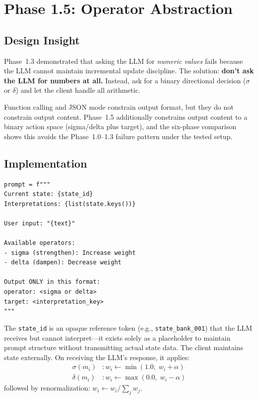 \documentclass[11pt,a4paper]{article}
\begin{document}
\section{Phase 1.5: Operator Abstraction}
\label{sec:phase1_5}

\subsection{Design Insight}

Phase~1.3 demonstrated that asking the LLM for \textit{numeric values} fails because
the LLM cannot maintain incremental update discipline. The solution: \textbf{don't
ask the LLM for numbers at all.} Instead, ask for a binary directional decision
($\sigma$ or $\delta$) and let the client handle all arithmetic.

Function calling and JSON mode constrain output format, but they do not constrain
output content. Phase~1.5 additionally constrains output content to a binary
action space (sigma/delta plus target), and the six-phase comparison
shows this avoids the Phase~1.0--1.3 failure pattern under the tested setup.

\subsection{Implementation}

\begin{lstlisting}
prompt = f"""
Current state: {state_id}
Interpretations: {list(state.keys())}

User input: "{text}"

Available operators:
- sigma (strengthen): Increase weight
- delta (dampen): Decrease weight

Output ONLY in this format:
operator: <sigma or delta>
target: <interpretation_key>
"""
\end{lstlisting}

The \texttt{state\_id} is an opaque reference token (e.g., \texttt{state\_bank\_001})
that the LLM receives but cannot interpret---it exists solely as a placeholder
to maintain prompt structure without transmitting actual state data. The client
maintains state externally. On receiving the LLM's response, it applies:
\begin{align}
\sigma(m_i) &: w_i \leftarrow \min(1.0,\; w_i + \alpha) \\
\delta(m_i) &: w_i \leftarrow \max(0.0,\; w_i - \alpha)
\end{align}
followed by renormalization: $w_i \leftarrow w_i / \sum_j w_j$.
\end{document}
